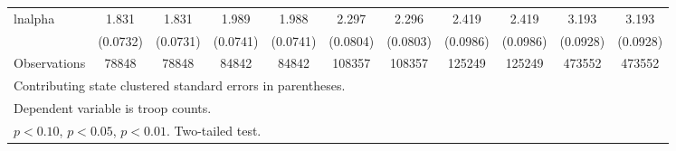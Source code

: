 \begin{table}[htbp]
\begin{tabular}{l*{12}{c}}
\hline
lnalpha & 1.831\sym{**}& 1.831\sym{**}& 1.989\sym{**}& 1.988\sym{**}& 2.297\sym{**}& 2.296\sym{**}& 2.419\sym{**}& 2.419\sym{**} & \multicolumn{2}{c}{3.193\sym{**}} & \multicolumn{2}{c}{3.193\sym{**}}\\
        & (0.0732)     & (0.0731)     & (0.0741)     & (0.0741)     & (0.0804)     & (0.0803)     & (0.0986)     & (0.0986)      & \multicolumn{2}{c}{(0.0928)}      & \multicolumn{2}{c}{(0.0928)}\\
\hline
Observations & 78848 & 78848 & 84842 & 84842 & 108357 & 108357 & 125249 & 125249 & \multicolumn{2}{c}{473552} & \multicolumn{2}{c}{473552} \\
\hline\hline
\multicolumn{9}{l}{\fontsize{7.5}{7.5}\selectfont Contributing state clustered standard errors in parentheses.}\\
\multicolumn{9}{l}{\fontsize{7.5}{7.5}\selectfont Dependent variable is troop counts.}\\
\multicolumn{9}{l}{\fontsize{7.5}{7.5}\selectfont \sym{\dagger} \(p<0.10\), \sym{*} \(p<0.05\), \sym{**} \(p<0.01\). Two-tailed test.}\\
\end{tabular}
\vspace{-15em}
\end{table}
